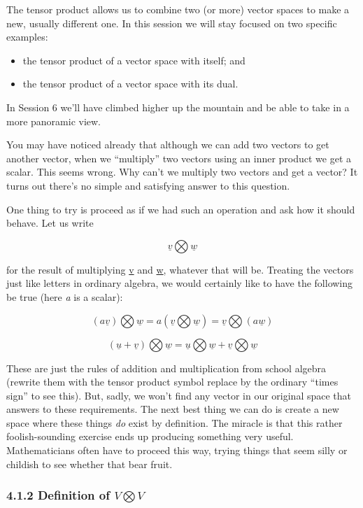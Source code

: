 \documentclass[oneside,english]{amsbook}
\numberwithin{section}{chapter}
\theoremstyle{plain}
\theoremstyle{definition}
\begin{document}
The tensor product allows us to combine two (or more) vector spaces to
make a new, usually different one. In this session we will stay focused
on two specific examples:

\begin{itemize}
	\item
	the tensor product of a vector space with itself; and
	\item
	the tensor product of a vector space with its dual.
\end{itemize}

In Session 6 we'll have climbed higher up the mountain and be able to
take in a more panoramic view.

You may have noticed already that although we can add two vectors to get
another vector, when we ``multiply'' two vectors using an inner product
we get a scalar. This seems wrong. Why can't we multiply two vectors and
get a vector? It turns out there's no simple and satisfying answer to
this question.

One thing to try is proceed as if we had such an operation and ask how
it should behave. Let us write

\[\underline{v}\bigotimes\underline{w}\]

for the result of multiplying \ul{v} and \ul{w}, whatever that will be.
Treating the vectors just like letters in ordinary algebra, we would
certainly like to have the following be true (here \emph{a} is a
scalar):

\[\left( a\underline{v} \right)\bigotimes\underline{w} = a\left( \underline{v}\bigotimes\underline{w} \right) = \underline{v}\bigotimes(a\underline{w})\]

\[\left( \underline{u} + \underline{v} \right)\bigotimes\underline{w} = \underline{u}\bigotimes\underline{w} + \underline{v}\bigotimes\underline{w}\]

These are just the rules of addition and multiplication from school
algebra (rewrite them with the tensor product symbol replace by the
ordinary ``times sign'' to see this). But, sadly, we won't find any
vector in our original space that answers to these requirements. The
next best thing we can do is create a new space where these things
\emph{do} exist by definition. The miracle is that this rather
foolish-sounding exercise ends up producing something very useful.
Mathematicians often have to proceed this way, trying things that seem
silly or childish to see whether that bear fruit.

\subsubsection{\texorpdfstring{4.1.2 Definition of
		\(V\bigotimes V\)}{4.1.2 Definition of V\textbackslash bigotimes V}}\label{definition-of-vbigotimes-v}
\end{document}
